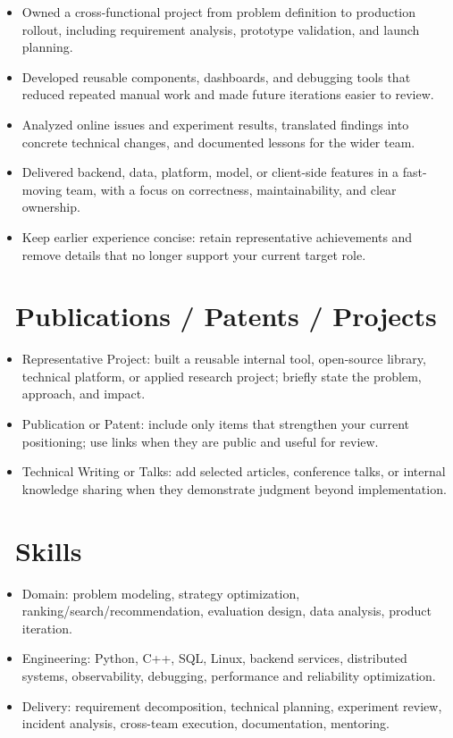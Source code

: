 \documentclass{resume}
\begin{document}
\begin{itemize}
  \item Owned a cross-functional project from problem definition to production rollout, including requirement analysis, prototype validation, and launch planning.
  \item Developed reusable components, dashboards, and debugging tools that reduced repeated manual work and made future iterations easier to review.
  \item Analyzed online issues and experiment results, translated findings into concrete technical changes, and documented lessons for the wider team.
\end{itemize}

\begin{itemize}
  \item Delivered backend, data, platform, model, or client-side features in a fast-moving team, with a focus on correctness, maintainability, and clear ownership.
  \item Keep earlier experience concise: retain representative achievements and remove details that no longer support your current target role.
\end{itemize}

\section{\faFileTextO\ Publications / Patents / Projects}
\begin{itemize}
  \item Representative Project: built a reusable internal tool, open-source library, technical platform, or applied research project; briefly state the problem, approach, and impact.
  \item Publication or Patent: include only items that strengthen your current positioning; use links when they are public and useful for review.
  \item Technical Writing or Talks: add selected articles, conference talks, or internal knowledge sharing when they demonstrate judgment beyond implementation.
\end{itemize}

\section{\faCogs\ Skills}
\begin{itemize}
  \item Domain: problem modeling, strategy optimization, ranking/search/recommendation, evaluation design, data analysis, product iteration.
  \item Engineering: Python, C++, SQL, Linux, backend services, distributed systems, observability, debugging, performance and reliability optimization.
  \item Delivery: requirement decomposition, technical planning, experiment review, incident analysis, cross-team execution, documentation, mentoring.
\end{itemize}
\end{document}
